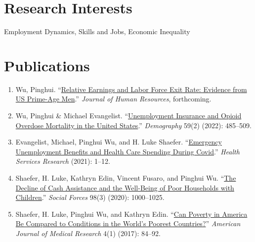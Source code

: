 \documentclass[11pt,letterpaper]{article}
\begin{document}
\section*{Research Interests}
\noindent Employment Dynamics, Skills and Jobs, Economic Inequality

\section*{Publications}

\begin{enumerate}[leftmargin=15pt, itemsep=6pt, parsep=0pt]
    \item Wu, Pinghui. ``\href{papers/Wu_2026_Relative_Earnings_and_Labor_Force_Exit.pdf}{Relative Earnings and Labor Force Exit Rate: Evidence from US Prime-Age Men}.'' \textit{Journal of Human Resources}, forthcoming.

    \item Wu, Pinghui \& Michael Evangelist. ``\href{https://doi.org/10.1215/00703370-9772414}{Unemployment Insurance and Opioid Overdose Mortality in the United States}.'' \textit{Demography} 59(2) (2022): 485--509.

    \item Evangelist, Michael, Pinghui Wu, and H. Luke Shaefer. ``\href{https://doi.org/10.1111/1475-6773.13772}{Emergency Unemployment Benefits and Health Care Spending During Covid}.'' \textit{Health Services Research} (2021): 1--12.

    \item Shaefer, H. Luke, Kathryn Edin, Vincent Fusaro, and Pinghui Wu. ``\href{https://doi.org/10.1093/sf/soz020}{The Decline of Cash Assistance and the Well-Being of Poor Households with Children}.'' \textit{Social Forces} 98(3) (2020): 1000--1025.

    \item Shaefer, H. Luke, Pinghui Wu, and Kathryn Edin. ``\href{https://doi.org/10.22381/AJMR4120176}{Can Poverty in America Be Compared to Conditions in the World's Poorest Countries?}'' \textit{American Journal of Medical Research} 4(1) (2017): 84--92.
\end{enumerate}
\end{document}
